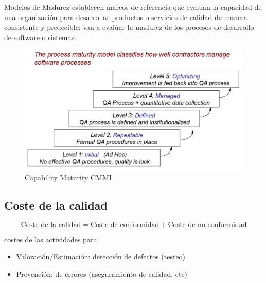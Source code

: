 \begin{paracol}{2}
   Modelos de Madurez establecen marcos de referencia que evalúan la capacidad de una organización para desarrollar productos o servicios de calidad de manera consistente y predecible; van a evalúar la madurez de los procesos de desarrollo de software o sistemas.
   
   \switchcolumn

   \begin{figure}[htbp]
      \centering
      \includegraphics{images/01/madurez.png}
      \caption{Capability Maturity CMMI}
      \label{fig:01/madurez}
   \end{figure}

\end{paracol}


\subsection{Coste de la calidad}
\begin{equation}
   \text{Coste de la calidad} = \text{Coste de conformidad} + \text{Coste de no conformidad}
\end{equation}

\begin{definition}
	costes de las actividades para:
	\begin{itemize}
		\item Valoración/Estimación: detección de defectos (testeo)
		\item Prevención: de errores (aseguramiento de calidad, etc)
	\end{itemize}
\end{definition}


